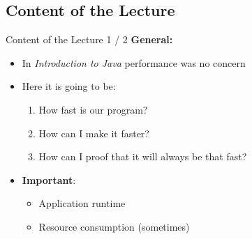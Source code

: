 \subsection{Content of the Lecture}

\begin{frame}{Content of the Lecture 1 / 2}
  \textbf{General:}
  \begin{itemize}
    \item
      In \textit{Introduction to Java} performance was no concern
    \item
      Here it is going to be:
      \begin{enumerate}
        \item
          How fast is our program?
        \item
          How can I make it faster?
        \item
          How can I proof that it will always be that fast?
      \end{enumerate}
    \item
      \textbf{Important}:
      \begin{itemize}
        \item
          Application runtime
        \item
          Resource consumption (sometimes)
      \end{itemize}
  \end{itemize}
\end{frame}


